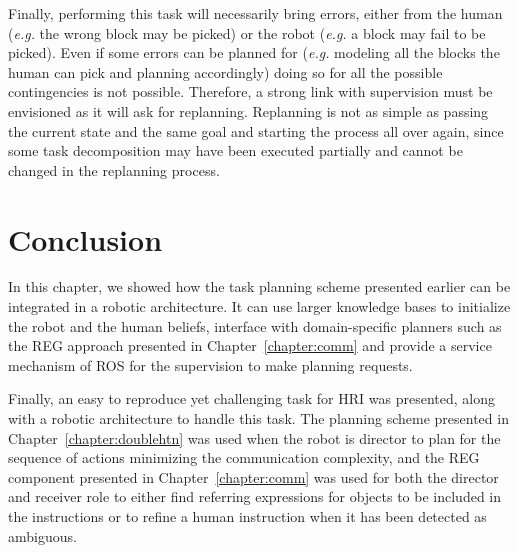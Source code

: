 \documentclass[a4paper,11pt,twoside]{StyleThese}
\begin{document}
Finally, performing this task will necessarily bring errors, either from the human (\textit{e.g.} the wrong block may be picked) or the robot (\textit{e.g.} a block may fail to be picked). Even if some errors can be planned for (\textit{e.g.} modeling all the blocks the human can pick and planning accordingly) doing so for all the possible contingencies is not possible. Therefore, a strong link with supervision must be envisioned as it will ask for replanning. Replanning is not as simple as passing the current state and the same goal and starting the process all over again, since some task decomposition may have been executed partially and cannot be changed in the replanning process.


\section{Conclusion}
In this chapter, we showed how the task planning scheme presented earlier can be integrated in a robotic architecture. It can use larger knowledge bases to initialize the robot and the human beliefs, interface with domain-specific planners such as the REG approach presented in Chapter~\ref{chapter:comm} and provide a service mechanism of ROS for the supervision to make planning requests.

Finally, an easy to reproduce yet challenging task for HRI was presented, along with a robotic architecture to handle this task. The planning scheme presented in Chapter~\ref{chapter:doublehtn} was used when the robot is director to plan for the sequence of actions minimizing the communication complexity, and the REG component presented in Chapter~\ref{chapter:comm} was used for both the director and receiver role to either find referring expressions for objects to be included in the instructions or to refine a human instruction when it has been detected as ambiguous.

\ifdefined{}
\else


\end{document}
